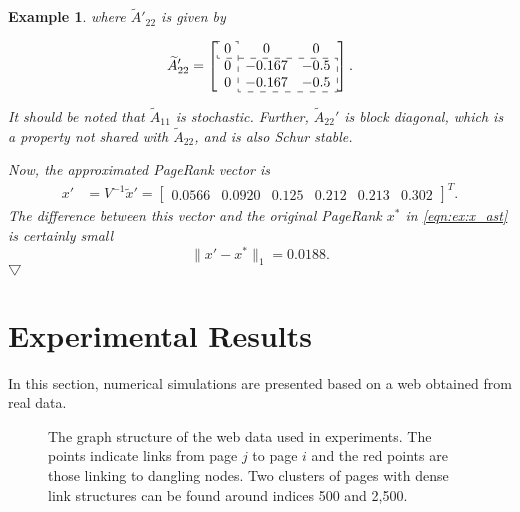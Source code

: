 \documentclass[11pt,draftcls,onecolumn]{IEEEtran}
\newtheorem{example}[theorem]{Example}
\newcommand{\norm}[1]{\lVert#1\rVert}
\newcommand{\End}{\hfill \mbox{$\bigtriangledown$}}
\newcommand{\fig}[3]{\resizebox{#1}{#2}{\texttt{[image: \#3]}}}
\begin{document}
\begin{example}
\vspace*{-2mm}
\noindent
where $\widetilde{A}'_{22}$ is given by

\vspace*{-2mm}
{\small
\begin{align*}
  \widetilde{A}'_{22}   
= \left[\begin{array}{ccc}
        \cdashline{1-1}
        \multicolumn{1}{:c:}{0} &   0     &   0\\
        \cdashline{1-3}
        0 &  \multicolumn{1}{:c}{-0.167} &  \multicolumn{1}{c:}{-0.5}\\
        0 &  \multicolumn{1}{:c}{-0.167} &  \multicolumn{1}{c:}{-0.5}\\
        \cdashline{2-3}
      \end{array}\right].
\end{align*}}

\vspace*{-2mm}
\noindent
It should be noted that $\widetilde{A}_{11}$ is stochastic. Further, 
$\widetilde{A}_{22}'$ is block diagonal, which is a property
not shared with $\widetilde{A}_{22}$, and is also Schur stable.

Now, the approximated PageRank vector is
\begin{align*}
  x' &= V^{-1} \widetilde{x}'
      = \begin{bmatrix}
         0.0566 & 0.0920 & 0.125 & 0.212 & 0.213 & 0.302
       \end{bmatrix}^T.
\end{align*}
The difference between this vector and the original PageRank $x^*$ 
in \eqref{eqn:ex:x_ast} is certainly small 
\[
 \norm{x'-x^*}_1 
    = 0.0188.
\]
\End
\end{example}



\section*{Experimental Results}

In this section, numerical simulations are presented based on 
a web obtained from real data.

\begin{figure}[t]
  \centering
  \fig{13cm}{!}{G_orig_red_dangling1.eps}
  \caption{The graph structure of the web data used in experiments. 
   The points indicate links from page $j$ to page $i$ and the red points 
   are those linking to dangling nodes.
   Two clusters of pages with dense link structures can be found around 
   indices 500 and 2,500.}
  \label{fig:G_orig}
\end{figure}
\end{document}

